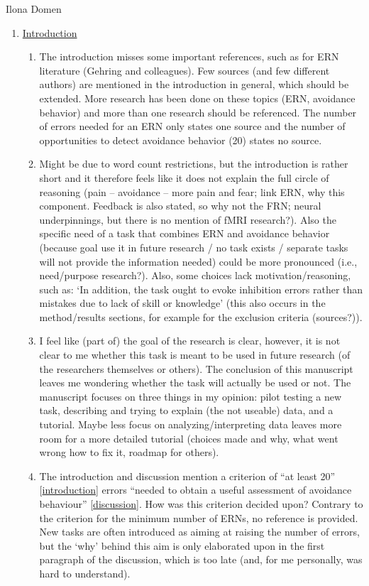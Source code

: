 \documentclass[twocolumn, serif, authordate, review]{jote-article}
\begin{document}
\begin{paracol}{2}
\begin{reviewend}{Ilona Domen}
\begin{enumerate}[label=\textbf{\arabic*}), start=0]
    \item \hyperref[sec:introduction]{Introduction}
        \begin{enumerate}
            \item The introduction misses some important references, such as for ERN literature (Gehring and colleagues). Few sources (and few different authors) are mentioned in the introduction in general, which should be extended. More research has been done on these topics (ERN, avoidance behavior) and more than one research should be referenced. The number of errors needed for an ERN only states one source and the number of opportunities to detect avoidance behavior (20) states no source.
            \item Might be due to word count restrictions, but the introduction is rather short and it therefore feels like it does not explain the full circle of reasoning (pain -- avoidance -- more pain and fear; link ERN, why this component. Feedback is also stated, so why not the FRN; neural underpinnings, but there is no mention of fMRI research?). Also the specific need of a task that combines ERN and avoidance behavior (because goal use it in future research / no task exists / separate tasks will not provide the information needed) could be more pronounced (i.e., need/purpose research?). Also, some choices lack motivation/reasoning, such as: `In addition, the task ought to evoke inhibition errors rather than mistakes due to lack of skill or knowledge' (this also occurs in the method/results sections, for example for the exclusion criteria (sources?)).
            \item I feel like (part of) the goal of the research is clear, however, it is not clear to me whether this task is meant to be used in future research (of the researchers themselves or others). The conclusion of this manuscript leaves me wondering whether the task will actually be used or not. The manuscript focuses on three things in my opinion: pilot testing a new task, describing and trying to explain (the not useable) data, and a tutorial. Maybe less focus on analyzing/interpreting data leaves more room for a more detailed tutorial (choices made and why, what went wrong how to fix it, roadmap for others). 
            \item The introduction and discussion mention a criterion of ``at least 20'' [\hyperref[sec:introduction]{introduction}] errors ``needed to obtain a useful assessment of avoidance behaviour'' [\hyperref[sec:discussion]{discussion}]. How was this criterion decided upon? Contrary to the criterion for the minimum number of ERNs, no reference is provided. New tasks are often introduced as aiming at raising the number of errors, but the `why' behind this aim is only elaborated upon in the first paragraph of the discussion, which is too late (and, for me personally, was hard to understand).
        \end{enumerate}


\end{enumerate}
\end{reviewend}
\end{paracol}
\end{document}
